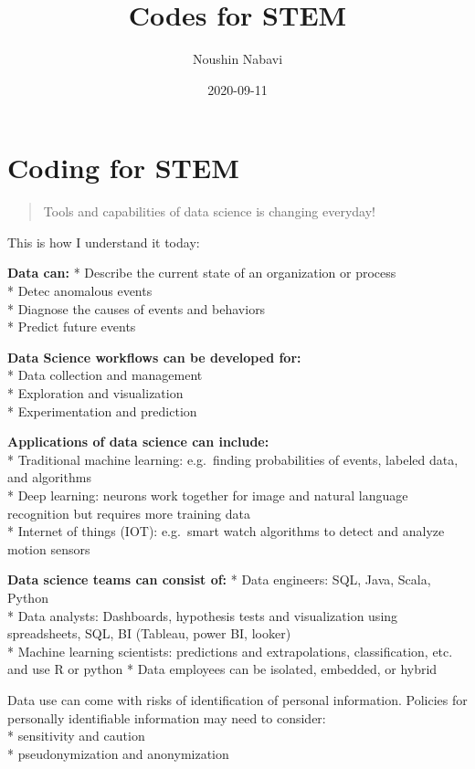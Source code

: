 \documentclass[]{book}
\title{Codes for STEM}
\author{Noushin Nabavi}
\date{2020-09-11}
\begin{document}
\maketitle

{
\setcounter{tocdepth}{1}
\tableofcontents
}
\hypertarget{coding-for-stem}{%
\chapter{Coding for STEM}\label{coding-for-stem}}

\begin{quote}
Tools and capabilities of data science is changing everyday!
\end{quote}

This is how I understand it today:

\textbf{Data can:}
* Describe the current state of an organization or process\\
* Detec anomalous events\\
* Diagnose the causes of events and behaviors\\
* Predict future events

\textbf{Data Science workflows can be developed for: }\\
* Data collection and management\\
* Exploration and visualization\\
* Experimentation and prediction

\textbf{Applications of data science can include: }\\
* Traditional machine learning: e.g.~finding probabilities of events, labeled data, and algorithms\\
* Deep learning: neurons work together for image and natural language recognition but requires more training data\\
* Internet of things (IOT): e.g.~smart watch algorithms to detect and analyze motion sensors

\textbf{Data science teams can consist of:}
* Data engineers: SQL, Java, Scala, Python\\
* Data analysts: Dashboards, hypothesis tests and visualization using spreadsheets, SQL, BI (Tableau, power BI, looker)\\
* Machine learning scientists: predictions and extrapolations, classification, etc. and use R or python * Data employees can be isolated, embedded, or hybrid

Data use can come with risks of identification of personal information. Policies for personally identifiable information may need to consider:\\
* sensitivity and caution\\
* pseudonymization and anonymization
\end{document}
